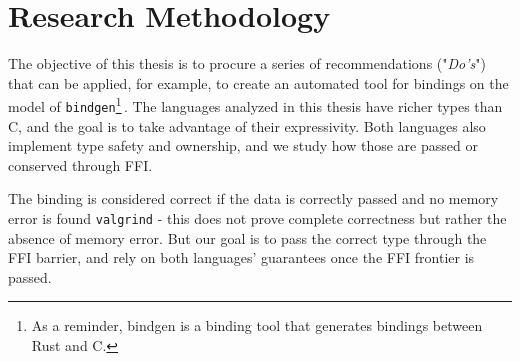 \documentclass[nomenclature, english, bibtex]{kththesis}
\newcommand*{\generalExpl}[1]{\todo[inline]{#1}}
\newcommand*{\sweExpl}[1]{\todo[inline, backgroundcolor=kth-lightblue40]{#1}}  %
\begin{document}

\section{Research Methodology}
The objective of this thesis is to procure a series of recommendations ("\textit{Do's}") that can be applied, for example, to create an automated tool for bindings on the model of \texttt{bindgen}\footnote{As a reminder, bindgen is a binding tool that generates bindings between Rust and C.}\,\cite{noauthor_bindgen_2022}. The languages analyzed in this thesis have richer types than C, and the goal is to take advantage of their expressivity. Both languages also implement type safety and ownership, and we study how those are passed or conserved through \gls{FFI}.

The binding is considered correct if the data is correctly passed and no memory error is found \texttt{valgrind} - this does not prove complete correctness but rather the absence of memory error. But our goal is to pass the correct type through the \gls{FFI} barrier, and rely on both languages' guarantees once the \gls{FFI} frontier is passed. 
\end{document}
